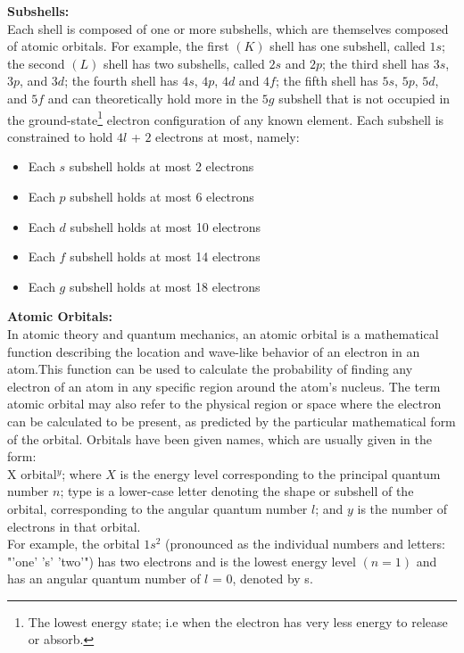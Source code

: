 \begin{chembox}{}
{\textbf{Subshells:}\\
Each shell is composed of one or more subshells, which are themselves composed of atomic orbitals. For example, the first $(K)$ shell has one subshell, called $1s$; the second $(L)$ shell has two subshells, called $2s$ and $2p$; the third shell has $3s$, $3p$, and $3d$; the fourth shell has $4s$, $4p$, $4d$ and $4f$; the fifth shell has $5s$, $5p$, $5d$, and $5f$ and can theoretically hold more in the $5g$ subshell that is not occupied in the ground-state\footnote{The lowest energy state; i.e when the electron has very less energy to release or absorb.} electron configuration of any known element.
Each subshell is constrained to hold $4l$ + $2$ electrons at most, namely:
\begin{itemize}
    \item {Each $s$ subshell holds at most 2 electrons}
    \item{Each $p$ subshell holds at most 6 electrons}
    \item{Each $d$ subshell holds at most 10 electrons}
    \item{Each $f$ subshell holds at most 14 electrons}
    \item{Each $g$ subshell holds at most 18 electrons}
\end{itemize}
\textbf{Atomic Orbitals:}\\
In atomic theory and quantum mechanics, an atomic orbital is a mathematical function describing the location and wave-like behavior of an electron in an atom.This function can be used to calculate the probability of finding any electron of an atom in any specific region around the atom's nucleus. The term atomic orbital may also refer to the physical region or space where the electron can be calculated to be present, as predicted by the particular mathematical form of the orbital.
Orbitals have been given names, which are usually given in the form:\\
X orbital$^y$; where $X$ is the energy level corresponding to the principal quantum number $n$; type is a lower-case letter denoting the shape or subshell of the orbital, corresponding to the angular quantum number $l$; and $y$ is the number of electrons in that orbital.\\
For example, the orbital $1s^2$ (pronounced as the individual numbers and letters: "'one' 's' 'two'") has two electrons and is the lowest energy level $(n = 1)$ and has an angular quantum number of $l$ = 0, denoted by s.}
\end{chembox}
